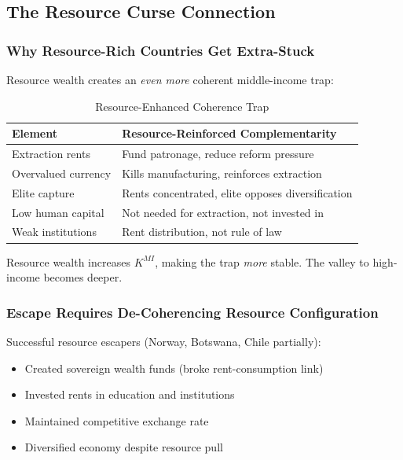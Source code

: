 \subsection{The Resource Curse Connection}

\subsubsection{Why Resource-Rich Countries Get Extra-Stuck}

Resource wealth creates an \emph{even more} coherent middle-income trap:

\begin{table}[htbp]
\centering
\caption{Resource-Enhanced Coherence Trap}
\label{tab:resource-trap}
\begin{tabular}{@{}ll@{}}
\toprule
\textbf{Element} & \textbf{Resource-Reinforced Complementarity} \\
\midrule
Extraction rents & Fund patronage, reduce reform pressure \\
Overvalued currency & Kills manufacturing, reinforces extraction \\
Elite capture & Rents concentrated, elite opposes diversification \\
Low human capital & Not needed for extraction, not invested in \\
Weak institutions & Rent distribution, not rule of law \\
\bottomrule
\end{tabular}
\end{table}

Resource wealth increases $K^{MI}$, making the trap \emph{more} stable. 
The valley to high-income becomes deeper.

\subsubsection{Escape Requires De-Coherencing Resource Configuration}

Successful resource escapers (Norway, Botswana, Chile partially):
\begin{itemize}
    \item Created sovereign wealth funds (broke rent-consumption link)
    \item Invested rents in education and institutions
    \item Maintained competitive exchange rate
    \item Diversified economy despite resource pull
\end{itemize}

